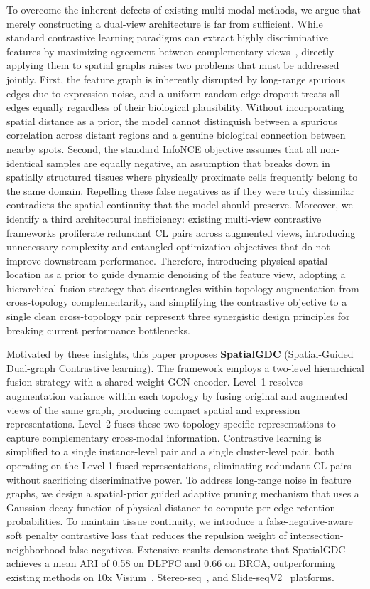 \documentclass[lettersize,journal]{IEEEtran}
\begin{document}
To overcome the inherent defects of existing multi-modal methods, we argue that merely constructing a dual-view architecture is far from sufficient. While standard contrastive learning paradigms can extract highly discriminative features by maximizing agreement between complementary views~\cite{chen2020simple}, directly applying them to spatial graphs raises two problems that must be addressed jointly. First, the feature graph is inherently disrupted by long-range spurious edges due to expression noise, and a uniform random edge dropout treats all edges equally regardless of their biological plausibility. Without incorporating spatial distance as a prior, the model cannot distinguish between a spurious correlation across distant regions and a genuine biological connection between nearby spots. Second, the standard InfoNCE objective assumes that all non-identical samples are equally negative, an assumption that breaks down in spatially structured tissues where physically proximate cells frequently belong to the same domain. Repelling these false negatives as if they were truly dissimilar contradicts the spatial continuity that the model should preserve. Moreover, we identify a third architectural inefficiency: existing multi-view contrastive frameworks proliferate redundant CL pairs across augmented views, introducing unnecessary complexity and entangled optimization objectives that do not improve downstream performance. Therefore, introducing physical spatial location as a prior to guide dynamic denoising of the feature view, adopting a hierarchical fusion strategy that disentangles within-topology augmentation from cross-topology complementarity, and simplifying the contrastive objective to a single clean cross-topology pair represent three synergistic design principles for breaking current performance bottlenecks.

Motivated by these insights, this paper proposes \textbf{SpatialGDC} (Spatial-Guided Dual-graph Contrastive learning). The framework employs a two-level hierarchical fusion strategy with a shared-weight GCN encoder. Level~1 resolves augmentation variance within each topology by fusing original and augmented views of the same graph, producing compact spatial and expression representations. Level~2 fuses these two topology-specific representations to capture complementary cross-modal information. Contrastive learning is simplified to a single instance-level pair and a single cluster-level pair, both operating on the Level-1 fused representations, eliminating redundant CL pairs without sacrificing discriminative power. To address long-range noise in feature graphs, we design a spatial-prior guided adaptive pruning mechanism that uses a Gaussian decay function of physical distance to compute per-edge retention probabilities. To maintain tissue continuity, we introduce a false-negative-aware soft penalty contrastive loss that reduces the repulsion weight of intersection-neighborhood false negatives. Extensive results demonstrate that SpatialGDC achieves a mean ARI of 0.58 on DLPFC and 0.66 on BRCA, outperforming existing methods on 10x Visium~\cite{maynard2021dlpfc}, Stereo-seq~\cite{chen2022stereoseq}, and Slide-seqV2~\cite{stickels2021slideseq} platforms.
\end{document}
